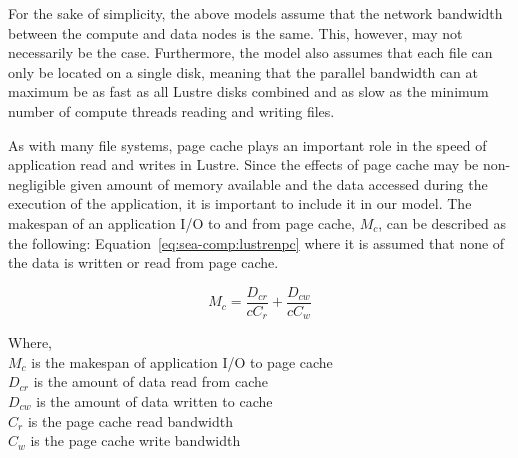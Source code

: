 \documentclass[10pt,journal,compsoc]{IEEEtran}
\begin{document}
      For the sake of simplicity, the above models assume that the network
      bandwidth between the compute and data nodes is the same. This, however,
      may not necessarily be the case. Furthermore, the model also assumes that
      each file can only be located on a single disk, meaning that the parallel
      bandwidth can at maximum be as fast as all Lustre disks combined and as
      slow as the minimum number of compute threads reading and writing files.

      As with many file systems, page cache plays an important role in the speed
      of application read and writes in Lustre. Since the effects of page cache
      may be non-negligible given amount of memory available and the data
      accessed during the execution of the application, it is important to
      include it in our model. The makespan of an application I/O to and from
      page cache, $M_{c}$, can be described as the following:
      Equation~\ref{eq:sea-comp:lustrenpc} where it is assumed that none of the
      data is written or read from page cache.


      \begin{equation}\label{eq:sea-comp:cache}
          M_{c} = \frac{D_{cr}}{cC_{r}} + \frac{D_{cw}}{cC_{w}}
      \end{equation}

      {\noindent} Where, \\
      $M_{c}$ is the makespan of application I/O to page cache \\
      $D_{cr}$ is the amount of data read from cache \\
      $D_{cw}$ is the amount of data written to cache \\
      $C_{r}$ is the page cache read bandwidth \\
      $C_{w}$ is the page cache write bandwidth \\ 


    

\end{document}
